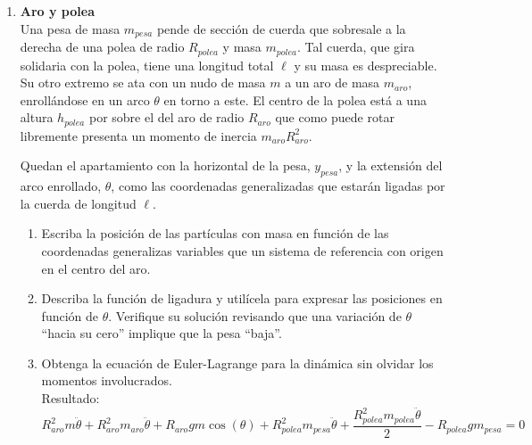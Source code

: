 \documentclass[11pt, spanish, a4paper, twoside]{article}
\begin{document}
\begin{enumerate}
	\item 
	\begin{minipage}[t][6cm]{0.57\textwidth}
		\textbf{Aro y polea}\\
		Una pesa de masa \(m_{pesa}\) pende de sección de cuerda que sobresale a la derecha de una polea de radio \(R_{polea}\) y masa \(m_{polea}\).
		Tal cuerda, que gira solidaria con la polea, tiene una longitud total \(\ell\) y su masa es despreciable.
		Su otro extremo se ata con un nudo de masa \(m\) a un aro de masa \(m_{aro}\), enrollándose en un arco \(\theta\) en torno a este.
		El centro de la polea está a una altura \(h_{polea}\) por sobre el del aro de radio \(R_{aro}\) que como puede rotar libremente presenta un momento de inercia \(m_{aro} R_{aro}^2\).

		Quedan el apartamiento con la horizontal de la pesa, \(y_{pesa}\), y la extensión del arco enrollado, \(\theta\), como las coordenadas generalizadas que estarán ligadas por la cuerda de longitud \(\ell\).
	\end{minipage}
	\begin{minipage}[c][1.5cm][t]{0.2\textwidth}
		
	\end{minipage}
	\begin{enumerate}
		\item Escriba la posición de las partículas con masa en función de las coordenadas generalizas variables que  un sistema de referencia con origen en el centro del aro.
		\item Describa la función de ligadura y utilícela para expresar las posiciones en función de \(\theta\).
		Verifique su solución revisando que una variación de \(\theta\) ``hacia su cero'' implique que la pesa ``baja''. 
		\item Obtenga la ecuación de Euler-Lagrange para la dinámica sin olvidar los momentos involucrados.\\
		Resultado:
		\(
		R_{aro}^{2} m \ddot{\theta} + R_{aro}^{2} m_{aro} \ddot{\theta} + R_{aro} g m \cos{\left(\theta \right)} + R_{polea}^{2} m_{pesa} \ddot{\theta} + \dfrac{R_{polea}^{2} m_{polea} \ddot{\theta}}{2} - R_{polea} g m_{pesa} = 0
		\)
	\end{enumerate}



\end{enumerate}
\end{document}
